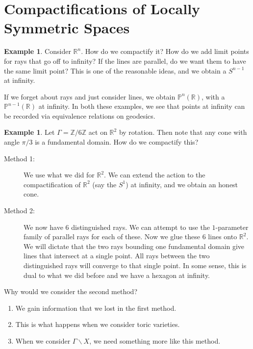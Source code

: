 \documentclass[leqno, openany]{memoir}
\theoremstyle{definition}
\newtheorem{exm}[thm]{Example}
\theoremstyle{remark}
\theoremstyle{plain}
\theoremstyle{definition}
\theoremstyle{remark}
\newcommand{\R}{\mathbb{R}}
\newcommand{\Z}{\mathbb{Z}}
\renewcommand{\P}{\mathbb{P}}
\begin{document}
\section{Compactifications of Locally Symmetric Spaces}%
\label{sec:compactifications_of_locally_symmetric_spaces}

\begin{exm}
    Consider $\R^n$. How do we compactify it? How do we add limit points for rays that go off to infinity? If the lines are parallel, do we want them to have the same limit point? This is one of the reasonable ideas, and we obtain a $S^{n-1}$ at infinity.

    If we forget about rays and just consider lines, we obtain $\P^n(\R)$, with a $\P^{n-1}(\R)$ at infinity. In both these examples, we see that points at infinity can be recorded via equivalence relations on geodesics.
\end{exm}

\begin{exm}
    Let $\Gamma = \Z/6\Z$ act on $\R^2$ by rotation. Then note that any cone with angle $\pi/3$ is a fundamental domain. How do we compactify this?
    \begin{description}
        \item[Method 1:] We use what we did for $\R^2$. We can extend the action to the compactification of $\R^2$ (say the $S^1$) at infinity, and we obtain an honest cone. 
        \item[Method 2:] We now have $6$ distinguished rays. We can attempt to use the $1$-parameter family of parallel rays for each of these. Now we glue these $6$ lines onto $\R^2$. We will dictate that the two rays bounding one fundamental domain give lines that intersect at a single point. All rays between the two distinguished rays will converge to that single point. In some sense, this is dual to what we did before and we have a hexagon at infinity.
    \end{description}

    Why would we consider the second method?
    \begin{enumerate}
        \item We gain information that we lost in the first method.
        \item This is what happens when we consider toric varieties.
        \item When we consider $\Gamma \backslash X$, we need something more like this method.
    \end{enumerate}
\end{exm}
\end{document}
